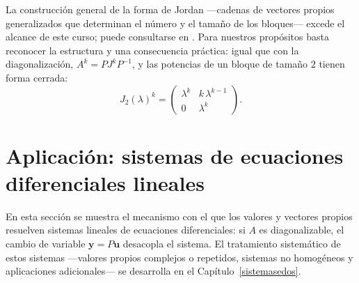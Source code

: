 \begin{rem}
La construcción general de la forma de Jordan —cadenas de vectores propios generalizados que determinan el número y el tamaño de los bloques— excede el alcance de este curso; puede consultarse en \cite{hoffman1973algebra}. Para nuestros propósitos basta reconocer la estructura y una consecuencia práctica: igual que con la diagonalización, $A^k=PJ^kP^{-1}$, y las potencias de un bloque de tamaño $2$ tienen forma cerrada:
\[
J_2(\lambda)^k=\begin{pmatrix}\lambda^k & k\,\lambda^{k-1}\\ 0 & \lambda^k\end{pmatrix}.
\]
\end{rem}

\section{Aplicación: sistemas de ecuaciones diferenciales lineales}

\begin{rem}
En esta sección se muestra el mecanismo con el que los valores y vectores propios resuelven sistemas lineales de ecuaciones diferenciales: si $A$ es diagonalizable, el cambio de variable $\mathbf{y}=P\mathbf{u}$ desacopla el sistema. El tratamiento sistemático de estos sistemas —valores propios complejos o repetidos, sistemas no homogéneos y aplicaciones adicionales— se desarrolla en el Capítulo~\ref{sistemasedos}.
\end{rem}

